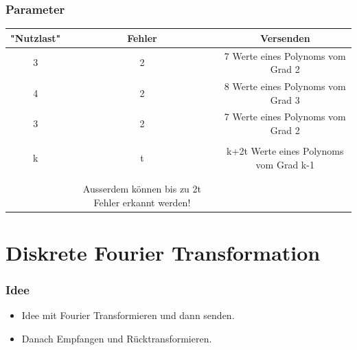 \documentclass[11pt,aspectratio=169]{beamer}
\begin{document}
	\begin{frame}
	\frametitle{Parameter}
	\begin{center}
		\begin{tabular}{ c c c } 
			\hline
			"Nutzlast" & Fehler & Versenden \\
			\hline 
			3 & 2 & 7 Werte eines Polynoms vom Grad 2 \\ 
			4 & 2 & 8 Werte eines Polynoms vom Grad 3 \\ 
			3 & 2 & 7 Werte eines Polynoms vom Grad 2 \\ 
			&&\\
			k & t & k+2t Werte eines Polynoms vom Grad k-1 \\ 
			\hline
			&&\\
			&&\\
			&Ausserdem können bis zu 2t Fehler erkannt werden!\\
		\end{tabular}
	\end{center}

	
		
	\end{frame}
\section{Diskrete Fourier Transformation}
	\begin{frame}
		\frametitle{Idee}
		\begin{itemize}
			\item Idee mit Fourier Transformieren und dann senden.
			\item Danach Empfangen und Rücktransformieren.
		\end{itemize}
	\end{frame}
\end{document}
